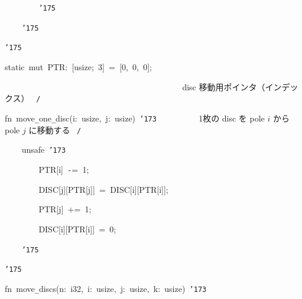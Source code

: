 \documentclass[a4paper,10pt]{article}
\def\mc{\relax}
\begin{document}
\noindent
\mbox{}{\tt\mc \ }{\tt\mc \ }{\tt\mc \ }{\tt\mc \ }{\tt\mc \ }{\tt\mc \ }{\tt\mc \ }{\tt\mc \ }{\tt\char'175}

\noindent
\mbox{}{\tt\mc \ }{\tt\mc \ }{\tt\mc \ }{\tt\mc \ }{\tt\char'175}

\noindent
\mbox{}{\tt\char'175}

\noindent
\mbox{}\hfill

\noindent
\mbox{}static{\tt\mc \ }mut{\tt\mc \ }PTR:{\tt\mc \ }[usize;{\tt\mc \ }3]{\tt\mc \ }={\tt\mc \ }[0,{\tt\mc \ }0,{\tt\mc \ }0];

\noindent
\mbox{}{\tt\mc \ \ \ \ \ \ \ \ }{\tt\mc \ \ \ \ \ \ \ \ }{\tt\mc \ \ \ \ \ \ \ \ }{\tt\mc \ \ \ \ \ \ \ \ }{\tt\mc \ \ \ \ \ \ \ \ }\rm\mc {\tt /}{\tt *}\  \ disc 移動用ポインタ（インデックス）
					   \hfill \rm\mc \ {\tt *}{\tt /}
\tt\mc 

\noindent
\mbox{}\hfill

\noindent
\mbox{}fn{\tt\mc \ }move{\tt\_}one{\tt\_}disc(i:{\tt\mc \ }usize,{\tt\mc \ }j:{\tt\mc \ }usize){\tt\mc \ }{\tt\char'173}{\tt\mc \ \ \ \ \ \ \ \ }\rm\mc {\tt /}{\tt *}\  \ 1枚の disc を pole $i$ から
					   pole $j$ に移動する \hfill \rm\mc \ {\tt *}{\tt /}
\tt\mc 

\noindent
\mbox{}{\tt\mc \ }{\tt\mc \ }{\tt\mc \ }{\tt\mc \ }unsafe{\tt\mc \ }{\tt\char'173}

\noindent
\mbox{}{\tt\mc \ }{\tt\mc \ }{\tt\mc \ }{\tt\mc \ }{\tt\mc \ }{\tt\mc \ }{\tt\mc \ }{\tt\mc \ }PTR[i]{\tt\mc \ }{\tt -}={\tt\mc \ }1;

\noindent
\mbox{}{\tt\mc \ }{\tt\mc \ }{\tt\mc \ }{\tt\mc \ }{\tt\mc \ }{\tt\mc \ }{\tt\mc \ }{\tt\mc \ }DISC[j][PTR[j]]{\tt\mc \ }={\tt\mc \ }DISC[i][PTR[i]];

\noindent
\mbox{}{\tt\mc \ }{\tt\mc \ }{\tt\mc \ }{\tt\mc \ }{\tt\mc \ }{\tt\mc \ }{\tt\mc \ }{\tt\mc \ }PTR[j]{\tt\mc \ }+={\tt\mc \ }1;

\noindent
\mbox{}{\tt\mc \ }{\tt\mc \ }{\tt\mc \ }{\tt\mc \ }{\tt\mc \ }{\tt\mc \ }{\tt\mc \ }{\tt\mc \ }DISC[i][PTR[i]]{\tt\mc \ }={\tt\mc \ }0;

\noindent
\mbox{}{\tt\mc \ }{\tt\mc \ }{\tt\mc \ }{\tt\mc \ }{\tt\char'175}

\noindent
\mbox{}{\tt\char'175}

\noindent
\mbox{}\hfill

\noindent
\mbox{}fn{\tt\mc \ }move{\tt\_}discs(n:{\tt\mc \ }i32,{\tt\mc \ }i:{\tt\mc \ }usize,{\tt\mc \ }j:{\tt\mc \ }usize,{\tt\mc \ }k:{\tt\mc \ }usize){\tt\mc \ }{\tt\char'173}
\end{document}
